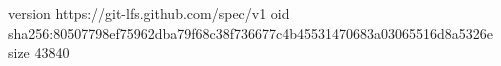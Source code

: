 version https://git-lfs.github.com/spec/v1
oid sha256:80507798ef75962dba79f68c38f736677c4b45531470683a03065516d8a5326e
size 43840
